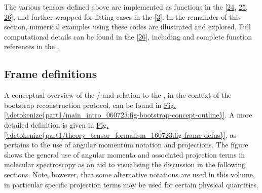\documentclass[letterpaper,table,10pt,english]{jupyterBook}
\begin{document}
\sphinxAtStartPar
The various tensors defined above are implemented as functions in the  {[}\hyperlink{cite.backmatter/bibliography:id655}{24}, \hyperlink{cite.backmatter/bibliography:id597}{25}, \hyperlink{cite.backmatter/bibliography:id595}{26}{]}, and further wrapped for fitting cases in the  {[}\hyperlink{cite.backmatter/bibliography:id668}{3}{]}. In the remainder of this section, numerical examples using these codes are illustrated and explored. Full computational details can be found in the  {[}\hyperlink{cite.backmatter/bibliography:id595}{26}{]}, including  and complete function references in the .


\subsection{Frame definitions}
\label{\detokenize{part1/theory_tensor_formalism_160723:frame-definitions}}\label{\detokenize{part1/theory_tensor_formalism_160723:sec-frame-definitions}}
\sphinxAtStartPar
A conceptual overview of the {\hyperref[\detokenize{backmatter/glossary:term-LF}]{}}/{\hyperref[\detokenize{backmatter/glossary:term-AF}]{}} and relation to the {\hyperref[\detokenize{backmatter/glossary:term-MF}]{}}, in the context of the bootstrap reconstruction protocol, can be found in \hyperref[\detokenize{part1/main_intro_060723:fig-bootstrap-concept-outline}]{Fig.\@ \ref{\detokenize{part1/main_intro_060723:fig-bootstrap-concept-outline}}}. A more detailed definition is given in \hyperref[\detokenize{part1/theory_tensor_formalism_160723:fig-frame-defns}]{Fig.\@ \ref{\detokenize{part1/theory_tensor_formalism_160723:fig-frame-defns}}}, as pertains to the use of angular momentum notation and projections. The figure shows the general use of angular momenta and associated projection terms in molecular spectroscopy as an aid to visualising the discussion in the following sections. Note, however, that some alternative notations are used in this volume, in particular specific projection terms may be used for certain physical quantities.
\end{document}

